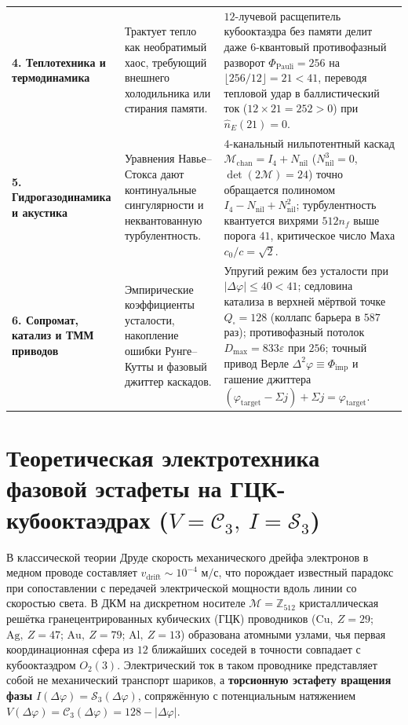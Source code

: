 \begin{table}[htbp]
\begin{tabular}{@{}p{}p{}p{}@{}}
\addlinespace[3pt]
\textbf{4. Теплотехника и термодинамика} &
Трактует тепло как необратимый хаос, требующий внешнего холодильника или стирания памяти. &
$12$-лучевой расщепитель кубооктаэдра без памяти делит даже $6$-квантовый противофазный разворот $\Phi_{\mathrm{Pauli}}=256$ на $\lfloor 256/12\rfloor = 21 < 41$, переводя тепловой удар в баллистический ток ($12\times 21=252>0$) при $\hat{n}_E(21)=0$. \\
\addlinespace[3pt]
\textbf{5. Гидрогазодинамика и акустика} &
Уравнения Навье--Стокса дают континуальные сингулярности и неквантованную турбулентность. &
$4$-канальный нильпотентный каскад $\mathcal{M}_{\mathrm{chan}} = I_4 + N_{\mathrm{nil}}$ ($N_{\mathrm{nil}}^3=0$, $\det(2\mathcal{M})=24$) точно обращается полиномом $I_4 - N_{\mathrm{nil}} + N_{\mathrm{nil}}^2$; турбулентность квантуется вихрями $512 n_f$ выше порога $41$, критическое число Маха $c_0/c=\sqrt{2}$. \\
\addlinespace[3pt]
\textbf{6. Сопромат, катализ и ТММ приводов} &
Эмпирические коэффициенты усталости, накопление ошибки Рунге--Кутты и фазовый джиттер каскадов. &
Упругий режим без усталости при $|\Delta\varphi|\le 40 < 41$; седловина катализа в верхней мёртвой точке $Q_\square=128$ (коллапс барьера в $587$ раз); противофазный потолок $D_{\max}=833\varepsilon$ при $256$; точный привод Верле $\Delta^2\varphi\equiv\Phi_{\mathrm{imp}}$ и гашение джиттера $(\varphi_{\mathrm{target}}-\Sigma j)+\Sigma j = \varphi_{\mathrm{target}}$. \\
\bottomrule
\end{tabular}
\end{table}

\chapter{Теоретическая электротехника фазовой эстафеты на ГЦК-кубооктаэдрах (\texorpdfstring{$V=\mathcal{C}_3,\ I=\mathcal{S}_3$}{V = C3, I = S3})}
\label{ch:eng-electrical-engineering}

В классической теории Друде скорость механического дрейфа электронов в медном проводе составляет $v_{\mathrm{drift}} \sim 10^{-4}\text{ м/с}$, что порождает известный парадокс при сопоставлении с передачей электрической мощности вдоль линии со скоростью света. В ДКМ на дискретном носителе $\mathcal{M} = \mathbb{Z}_{512}$ кристаллическая решётка гранецентрированных кубических (ГЦК) проводников ($\mathrm{Cu},\ Z=29$; $\mathrm{Ag},\ Z=47$; $\mathrm{Au},\ Z=79$; $\mathrm{Al},\ Z=13$) образована атомными узлами, чья первая координационная сфера из $12$ ближайших соседей в точности совпадает с кубооктаэдром $O_2(3)$. Электрический ток в таком проводнике представляет собой не механический транспорт шариков, а \textbf{торсионную эстафету вращения фазы} $I(\Delta\varphi) = \mathcal{S}_3(\Delta\varphi)$, сопряжённую с потенциальным натяжением $V(\Delta\varphi) = \mathcal{C}_3(\Delta\varphi) = 128 - |\Delta\varphi|$.

